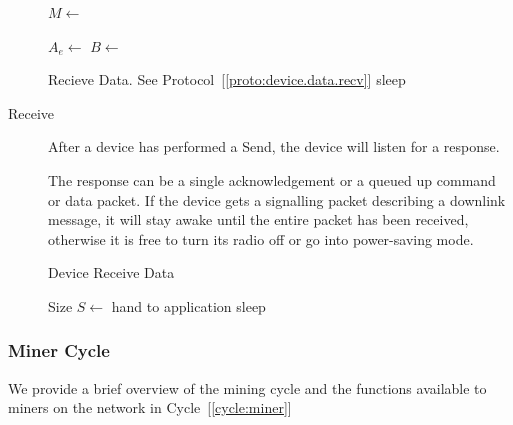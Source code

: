 \documentclass[10pt, nonatbib, nocopyrightspace, reprint]{sigplanconf}
\begin{document}
\begin{description}
\begin{algorithm}[!htb]
       {
        $M \leftarrow $  \;
         \;
        \BlankLine

        $A_e \leftarrow $  \;
        $B \leftarrow $  \;
         \;
        \BlankLine

         {
           {
            Recieve Data. See Protocol~[\ref{proto:device.data.recv}]
          }
           {sleep}
        }
      }
    \end{algorithm}
    \FloatBarrier

  \item [Receive] After a device has performed a Send, the device will listen for a response.

    The response can be a single acknowledgement or a queued up command or data packet. If the device gets a signalling packet describing a downlink message, it will stay awake until the entire packet has been received, otherwise it is free to turn its radio off or go into power-saving mode.

    \begin{algorithm}[!htb]
      \DontPrintSemicolon
      \caption{Device Receive Data}\label{proto:device.data.recv}

       {
        Size $S \leftarrow $  \;
         {
           {hand to application}
           {sleep}
        }
      }
    \end{algorithm}
    \FloatBarrier

\end{description}


\subsubsection{Miner Cycle}\label{mining}

We provide a brief overview of the mining cycle and the functions available to miners on the network in Cycle~[\ref{cycle:miner}]
\end{document}
